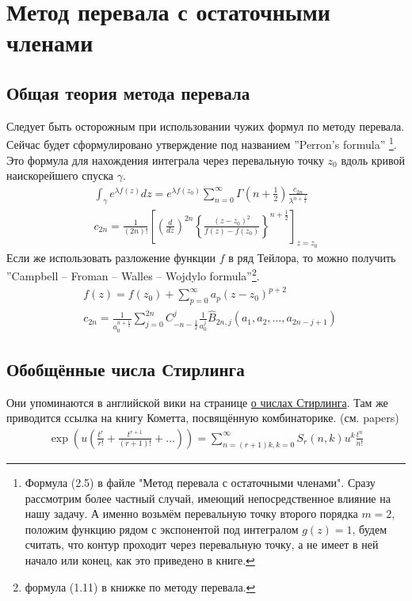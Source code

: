 \documentclass[a4paper, 12pt]{article}
\begin{document}
\section*{Метод перевала с остаточными членами}
\subsection*{Общая теория метода перевала}
Следует быть осторожным при использовании чужих формул по методу перевала. Сейчас будет сформулировано утверждение под названием ''Perron's formula''
\footnote{Формула (2.5) в файле "Метод перевала с остаточными членами". Сразу рассмотрим более частный случай, имеющий непосредственное влияние на нашу задачу. А именно возьмём перевальную точку второго порядка $m=2$, положим функцию рядом с экспонентой под интегралом $g(z)=1$, будем считать, что контур проходит через перевальную точку, а не имеет в ней начало или конец, как это приведено в книге.}. 
Это формула для нахождения интеграла через перевальную точку $z_0$ вдоль кривой наискорейшего спуска $\gamma$. 
\begin{equation}\label{steepest_decent}
\begin{aligned}
    \int_{\gamma} e^{\lambda f(z)} dz = e^{\lambda f(z_0)}\sum\limits_{n=0}^{\infty} \Gamma\left(n+\frac{1}{2}\right)\frac{c_{2n}}{\lambda^{n+\frac{1}{2}}} \\
    c_{2n} = \frac{1}{(2n)!}\left[\left(\frac{d}{dz}\right)^{2n}\left\lbrace\frac{(z-z_0)^2}{f(z)-f(z_0)}\right\rbrace^{n+\frac{1}{2}}\right]_{z=z_0}
\end{aligned}
\end{equation}
Если же использовать разложение функции $f$ в ряд Тейлора, то можно получить ''Campbell – Froman – Walles – Wojdylo formula''\footnote{формула (1.11) в книжке по методу перевала.}.
\begin{equation}\label{steepest_decent_taylor}
\begin{aligned}
    &f(z) = f(z_0) + \sum\limits_{p=0}^{\infty} a_p (z-z_0)^{p+2}\\
    &c_{2n} = \frac{1}{a_0^{n+\frac{1}{2}}}\sum\limits_{j=0}^{2n} C_{-n-\frac{1}{2}}^j\frac{1}{a_0^j}\hat{B}_{2n, j}\left(a_1, a_2, \dots, a_{2n-j+1}\right)
\end{aligned}
\end{equation}
\subsection*{Обобщённые числа Стирлинга}
Они упоминаются в английской вики на странице \href{https://en.wikipedia.org/wiki/Stirling_numbers_of_the_second_kind}{о числах Стирлинга}. Там же приводится ссылка на книгу Кометта, посвящённую комбинаторике. (см. papers)
\begin{equation}
\begin{aligned}
    \exp\left(u\left(\frac{t^r}{r!}+\frac{t^{r+1}}{\left(r+1\right)!}+\dots\right)\right) = \sum\limits_{n=(r+1)k, k = 0}^{\infty} S_{r}(n, k) u^k \frac{t^n}{n!}
\end{aligned}
\end{equation}
\end{document}
